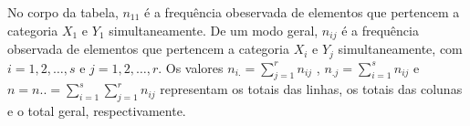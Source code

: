 No corpo da tabela, $n_{11}$ é a frequência obeservada de
elementos que pertencem a categoria $X_{1}$ e $Y_{1}$
 simultaneamente. De um modo geral, $n_{ij}$ é a frequência observada de elementos que pertencem a categoria
 $X_{i}$ e $Y_{j}$ simultaneamente, com $i=1,2, \ldots,s $ e $j=1,2, \ldots ,r $. Os valores
 $n_{i.}=\sum_{j=1}^{r}n_{ij}$ , $n_{.j}=\sum_{i=1}^{s}n_{ij}$ e $n=n..=\sum_{i=1}^{s}\sum_{j=1}^{r}n_{ij}$
representam os totais das linhas, os totais das colunas e o total
geral, respectivamente.















